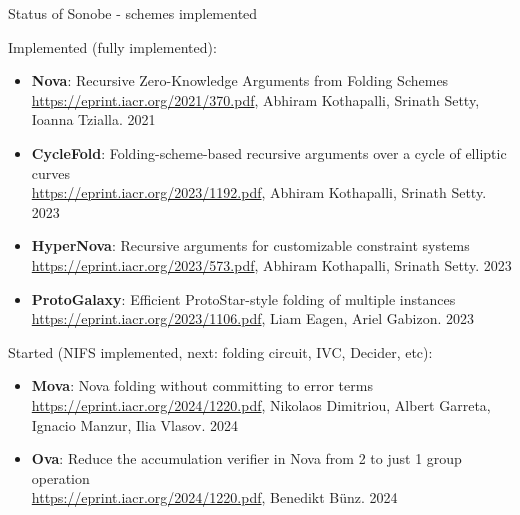 \documentclass[t]{beamer} \usefonttheme[onlymath]{serif}
\begin{document}
\begin{frame}{Status of Sonobe - schemes implemented}
  \scriptsize{
  Implemented (fully implemented):
  \begin{itemize}
    \item \textbf{Nova}: Recursive Zero-Knowledge Arguments from Folding Schemes\\ \href{https://eprint.iacr.org/2021/370.pdf}{https://eprint.iacr.org/2021/370.pdf}, Abhiram Kothapalli, Srinath Setty, Ioanna Tzialla. 2021
    \item \textbf{CycleFold}: Folding-scheme-based recursive arguments over a cycle of elliptic curves\\ \href{https://eprint.iacr.org/2023/1192.pdf}{https://eprint.iacr.org/2023/1192.pdf}, Abhiram Kothapalli, Srinath Setty. 2023
    \item \textbf{HyperNova}: Recursive arguments for customizable constraint systems\\ \href{https://eprint.iacr.org/2023/573.pdf}{https://eprint.iacr.org/2023/573.pdf}, Abhiram Kothapalli, Srinath Setty. 2023
    \item \textbf{ProtoGalaxy}: Efficient ProtoStar-style folding of multiple instances\\ \href{https://eprint.iacr.org/2023/1106.pdf}{https://eprint.iacr.org/2023/1106.pdf}, Liam Eagen, Ariel Gabizon. 2023
  \end{itemize}
  {\tiny
    Started (NIFS implemented, next: folding circuit, IVC, Decider, etc):
    \begin{itemize}
     \item \textbf{Mova}: Nova folding without committing to error terms\\ \href{https://eprint.iacr.org/2024/1220.pdf}{https://eprint.iacr.org/2024/1220.pdf}, Nikolaos Dimitriou, Albert Garreta, Ignacio Manzur, Ilia Vlasov. 2024
     \item \textbf{Ova}: Reduce the accumulation verifier in Nova from 2 to just 1 group operation\\ \href{https://eprint.iacr.org/2024/1220.pdf}{https://eprint.iacr.org/2024/1220.pdf}, Benedikt Bünz. 2024
    \end{itemize}
  }

}
\end{frame}
\end{document}
